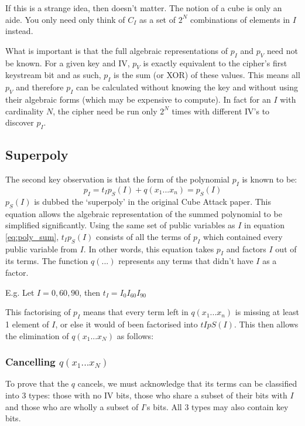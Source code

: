 \documentclass{report}
\let\Oldsubsection\subsection
\renewcommand{\subsection}{\FloatBarrier\Oldsubsection}
\let\Oldsubsubsection\subsubsection
\renewcommand{\subsubsection}{\FloatBarrier\Oldsubsubsection}
\begin{document}
If this is a strange idea, then doesn't matter. The notion of a cube is only an aide. You only need only think of $C_I$ as a set of $2^N$ combinations of elements in $I$ instead.

What is important is that the full algebraic representations of $p_I$ and $p_V$ need not be known. For a given key and IV, $p_V$ is exactly equivalent to the cipher's first keystream bit and as such, $p_I$ is the sum (or XOR) of these values. This means all $p_V$ and therefore $p_I$ can be calculated without knowing the key and without using their algebraic forms (which may be expensive to compute). In fact for an $I$ with cardinality $N$, the cipher need be run only $2^N$ times with different IV's to discover $p_I$.

\subsection{Superpoly}
The second key observation is that the form of the polynomial $p_I$ is known to be:
\begin{equation} \label{eq:superpoly}
p_I = t_Ip_S(I)+q(x_1...x_n)=p_S(I)
\end{equation}
$p_S(I)$ is dubbed the `superpoly' in the original Cube Attack paper. This equation allows the algebraic representation of the summed polynomial to be simplified significantly. Using the same set of public variables as $I$ in equation \ref{eq:poly_sum}, $t_Ip_S(I)$ consists of all the terms of $p_I$ which contained every public variable from $I$. In other words, this equation takes $p_I$ and factors $I$ out of its terms. The function $q(...)$ represents any terms that didn't have $I$ as a factor.

E.g. Let $I={0, 60, 90}$, then  $t_I = I_{0}I_{60}I_{90}$

This factorising of $p_I$ means that every term left in $q(x_1...x_n)$ is missing at least 1 element of $I$, or else it would of been factorised into $tIpS(I)$. This then allows the elimination of $q(x_1...x_N)$ as follows:

\subsubsection{Cancelling $q(x_1...x_N)$}
To prove that the $q$ cancels, we must acknowledge that its terms can be classified into 3 types: those with no IV bits, those who share a subset of their bits with $I$ and those who are wholly a subset of $I$'s bits. All 3 types may also contain key bits.
\end{document}
